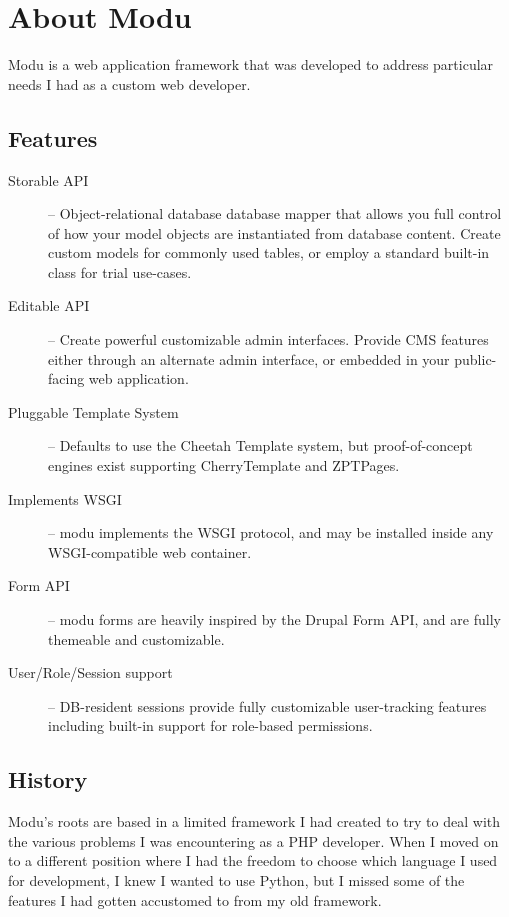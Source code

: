 \chapter{About Modu}

Modu is a web application framework that was developed to address particular
needs I had as a custom web developer.

\section{Features}

\begin{flushleft}
\begin{description}
    \item[Storable API]
    -- Object-relational database database mapper that allows you full
    control of how your model objects are instantiated from database
    content. Create custom models for commonly used tables, or employ a
    standard built-in class for trial use-cases.
    \item[Editable API]
    -- Create powerful customizable admin interfaces. Provide CMS features
    either through an alternate admin interface, or embedded in your public-
    facing web application.
    \item[Pluggable Template System]
    -- Defaults to use the Cheetah Template system, but proof-of-concept
    engines exist supporting CherryTemplate and ZPTPages.
    \item[Implements WSGI]
    -- modu implements the WSGI protocol, and may be installed inside any
    WSGI-compatible web container.
    \item[Form API]
    -- modu forms are heavily inspired by the Drupal Form API, and are
    fully themeable and customizable.
    \item[User/Role/Session support]
    -- DB-resident sessions provide fully customizable user-tracking features
    including built-in support for role-based permissions.
\end{description}
\end{flushleft}

\section{History}

Modu's roots are based in a limited framework I had created to try to deal
with the various problems I was encountering as a PHP developer. When I
moved on to a different position where I had the freedom to choose which
language I used for development, I knew I wanted to use Python, but I missed
some of the features I had gotten accustomed to from my old framework.

